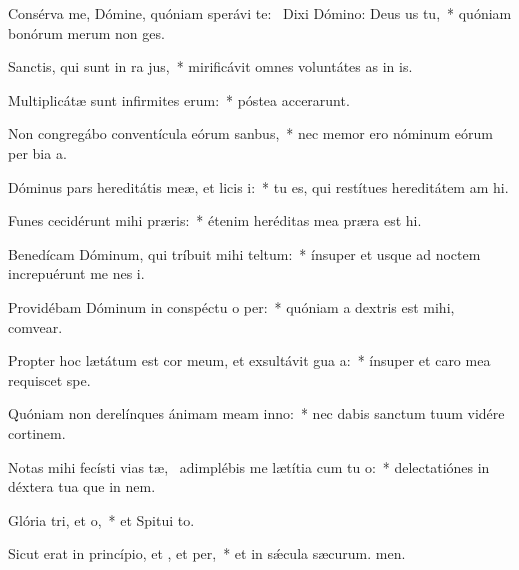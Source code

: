 \item Consérva me, Dómine, quóniam sperávi  te:~\pscross{} Dixi Dómino: Deus us  tu,~* quóniam bonórum merum non ges.
\item Sanctis, qui sunt in ra jus,~* mirificávit omnes voluntátes as in is.
\item Multiplicátæ sunt infirmites erum:~* póstea accerarunt.
\item Non congregábo conventícula eórum  sanbus,~* nec memor ero nóminum eórum per bia a.
\item Dóminus pars hereditátis meæ, et licis i:~* tu es, qui restítues hereditátem am hi.
\item Funes cecidérunt mihi  præris:~* étenim heréditas mea præra est hi.
\item Benedícam Dóminum, qui tríbuit mihi teltum:~* ínsuper et usque ad noctem increpuérunt me nes i.
\item Providébam Dóminum in conspéctu o per:~* quóniam a dextris est mihi,  comvear.
\item Propter hoc lætátum est cor meum, et exsultávit gua a:~* ínsuper et caro mea requiscet  spe.
\item Quóniam non derelínques ánimam meam  inno:~* nec dabis sanctum tuum vidére cortinem.
\item Notas mihi fecísti vias tæ,~\pscross{} adimplébis me lætítia cum tu o:~* delectatiónes in déxtera tua que in nem.
\item Glória tri, et o,~* et Spitui to.
\item Sicut erat in princípio, et , et per,~* et in sǽcula sæcurum. men.
